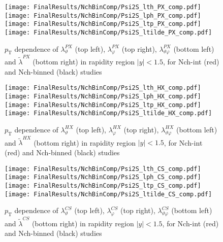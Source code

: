 \documentclass[12pt]{article}
\newcommand{\pT}{p_\mathrm{T}}
\newcommand{\absy}{\left |  y \right |}
\newcommand{\lamthCS}{\lambda^{\scriptscriptstyle CS}_\vartheta}
\newcommand{\lamphCS}{\lambda^{\scriptscriptstyle CS}_\varphi}
\newcommand{\lamthphCS}{\lambda^{\scriptscriptstyle CS}_{\vartheta \varphi}}
\newcommand{\lamtildeCS}{\tilde{\lambda}^{\scriptscriptstyle CS}}
\newcommand{\lamthHX}{\lambda^{\scriptscriptstyle HX}_\vartheta}
\newcommand{\lamphHX}{\lambda^{\scriptscriptstyle HX}_\varphi}
\newcommand{\lamthphHX}{\lambda^{\scriptscriptstyle HX}_{\vartheta \varphi}}
\newcommand{\lamtildeHX}{\tilde{\lambda}^{\scriptscriptstyle HX}}
\newcommand{\lamthPX}{\lambda^{\scriptscriptstyle PX}_\vartheta}
\newcommand{\lamphPX}{\lambda^{\scriptscriptstyle PX}_\varphi}
\newcommand{\lamthphPX}{\lambda^{\scriptscriptstyle PX}_{\vartheta \varphi}}
\newcommand{\lamtildePX}{\tilde{\lambda}^{\scriptscriptstyle PX}}
\begin{document}



\begin{figure}[htbp]
\centering
\texttt{[image: FinalResults/NchBinComp/Psi2S\_lth\_PX\_comp.pdf]}
\texttt{[image: FinalResults/NchBinComp/Psi2S\_lph\_PX\_comp.pdf]}
\texttt{[image: FinalResults/NchBinComp/Psi2S\_ltp\_PX\_comp.pdf]}
\texttt{[image: FinalResults/NchBinComp/Psi2S\_ltilde\_PX\_comp.pdf]}
\caption{$\pT$ dependence of $\lamthPX$
(top left), $\lamphPX$ (top right), $\lamthphPX$ (bottom left) and 
$\lamtildePX$ (bottom right) in rapidity region $\absy<1.5$, for Nch-int (red) and Nch-binned (black) studies }
\end{figure}
\clearpage







\begin{figure}[htbp]
\centering
\texttt{[image: FinalResults/NchBinComp/Psi2S\_lth\_HX\_comp.pdf]}
\texttt{[image: FinalResults/NchBinComp/Psi2S\_lph\_HX\_comp.pdf]}
\texttt{[image: FinalResults/NchBinComp/Psi2S\_ltp\_HX\_comp.pdf]}
\texttt{[image: FinalResults/NchBinComp/Psi2S\_ltilde\_HX\_comp.pdf]}
\caption{$\pT$ dependence of $\lamthHX$
(top left), $\lamphHX$ (top right), $\lamthphHX$ (bottom left) and 
$\lamtildeHX$ (bottom right) in rapidity region $\absy<1.5$, for Nch-int (red) and Nch-binned (black) studies }
\end{figure}
\clearpage






\begin{figure}[htbp]
\centering
\texttt{[image: FinalResults/NchBinComp/Psi2S\_lth\_CS\_comp.pdf]}
\texttt{[image: FinalResults/NchBinComp/Psi2S\_lph\_CS\_comp.pdf]}
\texttt{[image: FinalResults/NchBinComp/Psi2S\_ltp\_CS\_comp.pdf]}
\texttt{[image: FinalResults/NchBinComp/Psi2S\_ltilde\_CS\_comp.pdf]}
\caption{$\pT$ dependence of $\lamthCS$
(top left), $\lamphCS$ (top right), $\lamthphCS$ (bottom left) and 
$\lamtildeCS$ (bottom right) in rapidity region $\absy<1.5$, for Nch-int (red) and Nch-binned (black) studies }
\end{figure}
\clearpage
\end{document}
